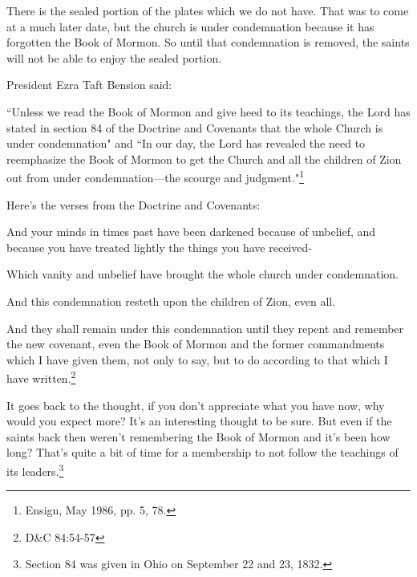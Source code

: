 There is the sealed portion of the plates which we do not have. That was to come at a
much later date, but the church is under condemnation because it has forgotten the
Book of Mormon. So until that condemnation is removed, the saints will not be able to
enjoy the sealed portion.

President Ezra Taft Bension said:

\begin{displayquote}
``Unless we read the Book of Mormon and give heed to its teachings, the Lord has stated 
in section 84 of the Doctrine and Covenants that the whole Church is under 
condemnation" and ``In our day, the Lord has revealed the need to reemphasize the 
Book of Mormon to get the Church and all the children of Zion out from under 
condemnation—the scourge and judgment."\footnote{Ensign, May 1986, pp. 5, 78.}
\end{displayquote}

Here's the verses from the Doctrine and Covenants:

\begin{displayquote}
And your minds in times past have been darkened because of unbelief, and because you 
have treated lightly the things you have received-

Which vanity and unbelief have brought the whole church under condemnation.

And this condemnation resteth upon the children of Zion, even all.

And they shall remain under this condemnation until they repent and remember the new 
covenant, even the Book of Mormon and the former commandments which I have given 
them, not only to say, but to do according to that which I have written.\footnote{
D\&C 84:54-57
}
\end{displayquote}

It goes back to the thought, if you don't appreciate what you have now, why would you
expect more? It's an interesting thought to be sure. But even if the saints back then
weren't remembering the Book of Mormon and it's been how long? That's quite a bit of
time for a membership to not follow the teachings of its leaders.\footnote{Section 84
was given in Ohio on September 22 and 23, 1832.} 